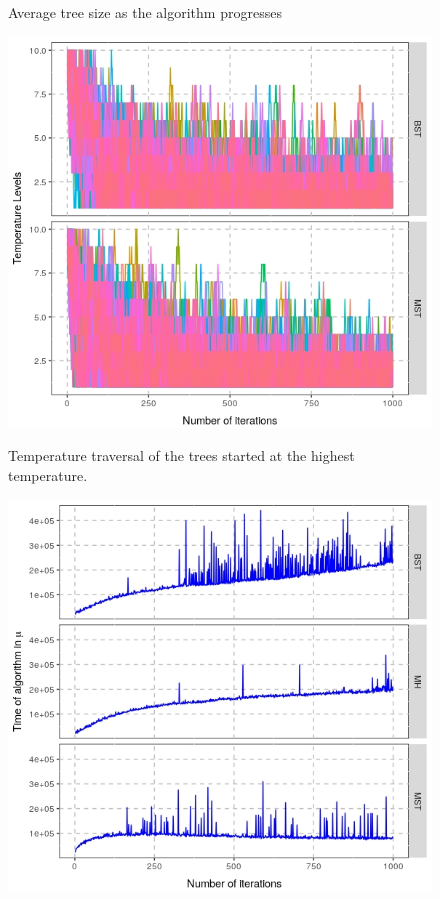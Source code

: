\documentclass[a1paper,portrait, fontscale=0.45]{baposter}
\begin{document}
\begin{poster}
{\begin{multicols}{3}
\begin{figure}[H]
\begin{minipage}[c]{0.6\linewidth}
\label{fig:compsize}
\vspace{-1.7em}
\caption{Average tree size as the algorithm progresses}
\end{minipage}
\end{figure}
\begin{figure}[H]
\hspace{1em}
\begin{minipage}[c]{0.6\linewidth}
\includegraphics[width=\linewidth]{comp2levels.jpeg}
\label{fig:compsimtem}
\vspace{-1.7em}
\caption{Temperature traversal of the trees started at the highest temperature.}
\end{minipage}
\end{figure}
\begin{figure}[H]
\hspace{1em}
\begin{minipage}[c]{0.6\linewidth}
\includegraphics[width=\linewidth]{comp3times.jpeg}

\end{minipage}
\end{figure}
\end{multicols}}
\end{poster}
\end{document}
